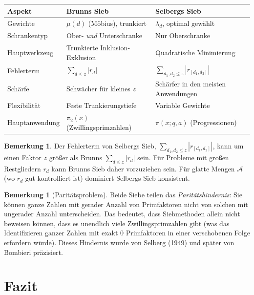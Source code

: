 \documentclass[12pt,a4paper]{amsart}
\theoremstyle{definition}
\newtheorem{bemerkung}[theorem]{Bemerkung}
\begin{document}
\begin{center}
\renewcommand{\arraystretch}{1.3}
\begin{tabular}{lll}
\toprule
\textbf{Aspekt} & \textbf{Brunns Sieb} & \textbf{Selbergs Sieb} \\
\midrule
Gewichte & $\mu(d)$ (Möbius), trunkiert & $\lambda_d$, optimal gewählt \\
Schrankentyp & Ober- \emph{und} Unterschranke & Nur Oberschranke \\
Hauptwerkzeug & Trunkierte Inklusion-Exklusion & Quadratische Minimierung \\
Fehlerterm & $\sum_{d \leq z} |r_d|$ & $\sum_{d_1,d_2 \leq z} |r_{[d_1,d_2]}|$ \\
Schärfe & Schwächer für kleines $z$ & Schärfer in den meisten Anwendungen \\
Flexibilität & Feste Trunkierungstiefe & Variable Gewichte \\
Hauptanwendung & $\pi_2(x)$ (Zwillingsprimzahlen) & $\pi(x;q,a)$ (Progressionen) \\
\bottomrule
\end{tabular}
\end{center}

\begin{bemerkung}
  Der Fehlerterm von Selbergs Sieb, $\sum_{d_1,d_2 \leq z} |r_{[d_1,d_2]}|$,
  kann um einen Faktor $z$ größer als Brunns $\sum_{d \leq z} |r_d|$ sein.
  Für Probleme mit großen Restgliedern $r_d$ kann Brunns Sieb daher
  vorzuziehen sein.  Für glatte Mengen $\mathcal{A}$ (wo $r_d$ gut kontrolliert
  ist) dominiert Selbergs Sieb konsistent.
\end{bemerkung}

\begin{bemerkung}[Paritätsproblem]
  Beide Siebe teilen das \emph{Paritätshindernis}: Sie können ganze Zahlen
  mit gerader Anzahl von Primfaktoren nicht von solchen mit ungerader Anzahl
  unterscheiden.  Das bedeutet, dass Siebmethoden allein nicht beweisen können,
  dass es unendlich viele Zwillingsprimzahlen gibt (was das Identifizieren ganzer
  Zahlen mit exakt $0$ Primfaktoren in einer verschobenen Folge erfordern würde).
  Dieses Hindernis wurde von Selberg (1949) und später von Bombieri präzisiert.
\end{bemerkung}

\section{Fazit}
\end{document}
